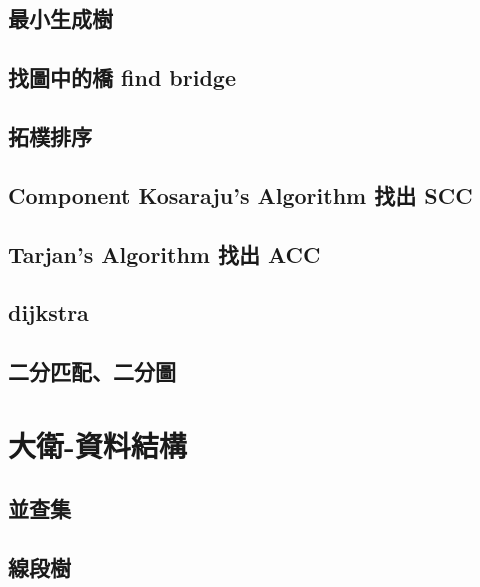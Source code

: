 \subsection{最小生成樹}
\raggedbottom
\hrulefill
\subsection{找圖中的橋 find bridge}
\raggedbottom
\hrulefill
\subsection{拓樸排序}
\raggedbottom
\hrulefill
\subsection{Component Kosaraju's Algorithm 找出 SCC}
\raggedbottom
\hrulefill
\subsection{Tarjan's Algorithm 找出 ACC}
\raggedbottom
\hrulefill
\subsection{dijkstra}
\raggedbottom
\hrulefill
\subsection{二分匹配、二分圖}
\raggedbottom
\hrulefill

\section{大衛-資料結構}
\subsection{並查集}
\raggedbottom
\hrulefill
\subsection{線段樹}
\raggedbottom
\hrulefill

